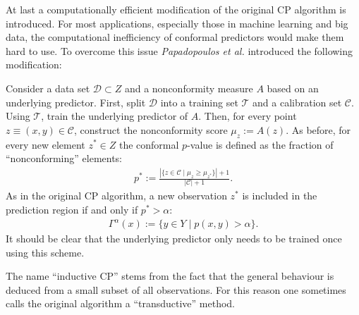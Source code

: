     At last a computationally efficient modification of the original CP algorithm is introduced. For most applications, especially those in machine learning and big data, the computational inefficiency of conformal predictors would make them hard to use. To overcome this issue \textit{Papadopoulos et al.} introduced the following modification:
    \begin{construct}[Inductive CP]
        Consider a data set $\mathcal{D}\subset Z$ and a nonconformity measure $A$ based on an underlying predictor. First, split $\mathcal{D}$ into a training set $\mathcal{T}$ and a calibration set $\mathcal{C}$. Using $\mathcal{T}$, train the underlying predictor of $A$. Then, for every point $z\equiv(x,y)\in\mathcal{C}$, construct the nonconformity score $\mu_z := A(z)$. As before, for every new element $z^*\in Z$ the conformal $p$-value is defined as the fraction of ``nonconforming'' elements:
        \begin{gather}
            \label{data:icp}
            p^* := \frac{|\{z\in\mathcal{C}\mid\mu_z\geq\mu_{z^*}\}|+1}{|\mathcal{C}|+1}.
       \end{gather}
        As in the original CP algorithm, a new observation $z^*$ is included in the prediction region if and only if $p^*>\alpha$:
        \begin{gather}
            \label{data:icp2}
            \Gamma^\alpha(x) := \{y\in Y\mid p(x,y)>\alpha\}.
        \end{gather}
        It should be clear that the underlying predictor only needs to be trained once using this scheme.
    \end{construct}
    \begin{remark}[Terminology]
        The name ``inductive CP'' stems from the fact that the general behaviour is deduced from a small subset of all observations. For this reason one sometimes calls the original algorithm a ``transductive'' method.
    \end{remark}

